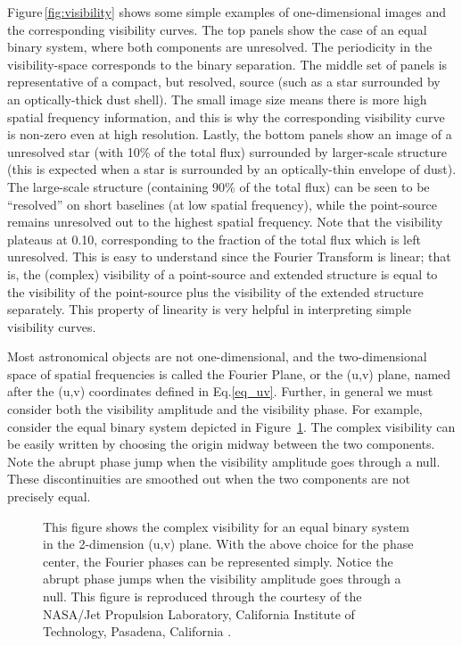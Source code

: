 \documentclass[12pt]{iopart}
\begin{document}
Figure\,\ref{fig:visibility} shows some simple examples of
one-dimensional images and the corresponding visibility curves.  The
top panels show the case of an equal binary system, where both
components are unresolved.  The periodicity in the visibility-space
corresponds to the binary separation.  The middle set of panels is
representative of a compact, but resolved, source (such as a star
surrounded by an optically-thick dust shell).  The small image size
means there is more high spatial frequency information, and this is why
the corresponding visibility curve is non-zero even at high
resolution. Lastly, the bottom panels show an image of a unresolved
star (with 10\% of the total flux) surrounded by larger-scale
structure (this is expected when a star is surrounded by an
optically-thin envelope of dust).  The large-scale structure
(containing 90\% of the total flux) can be seen to be ``resolved'' on
short baselines (at low spatial frequency), while the point-source
remains unresolved out to the highest spatial frequency.  Note that
the visibility plateaus at 0.10, corresponding to the fraction of the
total flux which is left unresolved.  This is easy to understand since
the Fourier Transform is linear; that is, the (complex) visibility of
a point-source and extended structure is equal to the visibility of
the point-source plus the visibility of the extended structure
separately.  This property of linearity is very helpful in
interpreting simple visibility curves.

Most astronomical objects are not one-dimensional, and the
two-dimensional space of spatial frequencies is called the
Fourier Plane, or the (u,v) plane, named after the (u,v) coordinates
defined in Eq.\ref{eq_uv}.  Further, in general we must consider both the
visibility amplitude and the visibility phase.
For example,
consider the equal binary system depicted in Figure~\ref{monnier_eg1}.
The complex visibility can be easily written by choosing the origin
midway between the two components.  Note the abrupt phase jump when
the visibility amplitude goes through a null.  These discontinuities
are smoothed out when the two components are not precisely equal.

\begin{figure}
\begin{center}
\caption
{This figure shows the complex visibility for an equal binary system
in the 2-dimension (u,v) plane.
With the above choice for the phase center, the Fourier phases can be
represented simply.  Notice the abrupt phase jumps when the 
visibility amplitude goes through a null. This figure is
reproduced through the courtesy
of the NASA/Jet Propulsion Laboratory, 
California Institute of Technology, Pasadena, California \citep{monnier_mss}.
\label{monnier_eg1}}
\end{center}
\end{figure}
\end{document}
